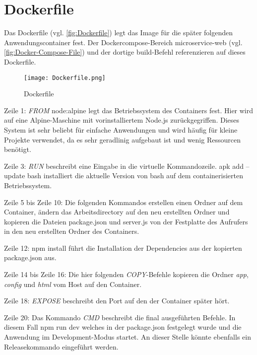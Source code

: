 
\chapter{Dockerfile}
\label{ch:Dockerfile}
Das Dockerfile (vgl. \autoref{fig:Dockerfile}) legt das Image für die später folgenden Anwendungscontainer fest. Der Dockercompose-Bereich \glqq  microservice-web\grqq{} (vgl. \autoref{fig:Docker-Compose-File}) und der dortige \glqq  build\grqq -Befehl referenzieren auf dieses Dockerfile.

\begin{wrapfigure}{r}{0\textwidth}
\centering
\texttt{[image: Dockerfile.png]}
\vspace{3pt}
\caption{Dockerfile}
\label{fig:Dockerfile}
\end{wrapfigure}

Zeile 1: \textit{FROM} node:alpine legt das Betriebssystem des Containers fest. Hier wird auf eine Alpine-Maschine mit vorinstalliertem Node.js zurückgegriffen. Dieses System ist sehr beliebt für einfache Anwendungen und wird häufig für kleine Projekte verwendet, da es sehr geradlinig aufgebaut ist und wenig Ressourcen benötigt.

Zeile 3: \textit{RUN} beschreibt eine Eingabe in die virtuelle Kommandozeile. \glqq  apk add --update bash\grqq{} installiert die aktuelle Version von bash auf dem containerisierten Betriebssystem.

Zeile 5 bis Zeile 10: Die folgenden Kommandos erstellen einen Ordner auf dem Container, ändern das Arbeitsdirectory auf den neu erstellten Ordner und kopieren die Dateien \glqq package.json\grqq{} und \glqq server.js\grqq{} von der Festplatte des Aufrufers in den neu erstellten Ordner des Containers.

Zeile 12: \glqq npm install\grqq{} führt die Installation der Dependencies aus der kopierten \glqq package.json\grqq{} aus.

Zeile 14 bis Zeile 16: Die hier folgenden \textit{COPY}-Befehle kopieren die Ordner \textit{app}, \textit{config} und \textit{html} vom Host auf den Container.

Zeile 18: \textit{EXPOSE} beschreibt den Port auf den der Container später hört.

Zeile 20: Das Kommando \textit{CMD} beschreibt die final ausgeführten Befehle. In diesem Fall \glqq npm run dev\grqq{} welches in der \glqq package.json\grqq{} festgelegt wurde und die Anwendung im Development-Modus startet. An dieser Stelle könnte ebenfalls ein Releasekommando eingeführt werden.